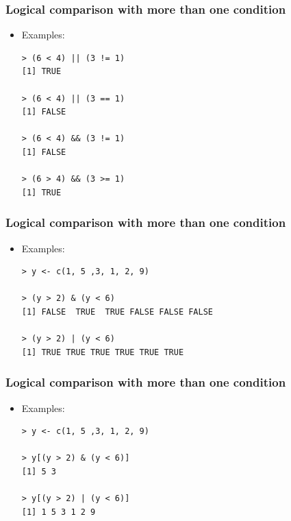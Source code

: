 \documentclass[xcolor=dvipsnames, xcolor=table]{beamer} %
\theoremstyle{mystyle}
\begin{document}
\begin{frame}[fragile] %
\frametitle{Logical comparison with more than one condition}

\begin{itemize}

\item Examples:

\begin{verbatim}
> (6 < 4) || (3 != 1)
[1] TRUE

> (6 < 4) || (3 == 1)
[1] FALSE

> (6 < 4) && (3 != 1)
[1] FALSE

> (6 > 4) && (3 >= 1)
[1] TRUE

\end{verbatim}

\end{itemize}

\end{frame}

\begin{frame}[fragile] %
\frametitle{Logical comparison with more than one condition}

\begin{itemize}

\item Examples:

\begin{verbatim}
> y <- c(1, 5 ,3, 1, 2, 9)

> (y > 2) & (y < 6)
[1] FALSE  TRUE  TRUE FALSE FALSE FALSE
 
> (y > 2) | (y < 6)
[1] TRUE TRUE TRUE TRUE TRUE TRUE

\end{verbatim}

\end{itemize}

\end{frame}

\begin{frame}[fragile] %
\frametitle{Logical comparison with more than one condition}

\begin{itemize}

\item Examples:

\begin{verbatim}
> y <- c(1, 5 ,3, 1, 2, 9)

> y[(y > 2) & (y < 6)]
[1] 5 3

> y[(y > 2) | (y < 6)]
[1] 1 5 3 1 2 9

\end{verbatim}

\end{itemize}

\end{frame}
\end{document}
